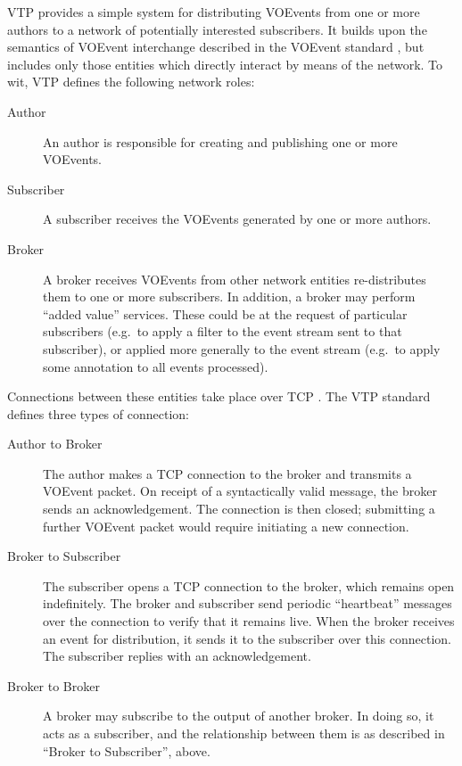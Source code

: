 \documentclass[5p,authoryear]{elsarticle}
\begin{document}
VTP provides a simple system for distributing VOEvents from one or more
authors to a network of potentially interested subscribers. It builds upon the
semantics of VOEvent interchange described in the VOEvent standard
\citep{Seaman:2011}, but includes only those entities which directly interact
by means of the network. To wit, VTP defines the following network roles:

\begin{description}

  \item[Author]{An author is responsible for creating and publishing one or
  more VOEvents.}

  \item[Subscriber]{A subscriber receives the VOEvents generated by one or
  more authors.}

  \item[Broker]{A broker receives VOEvents from other network entities
  re-distributes them to one or more subscribers. In addition, a broker may
  perform ``added value'' services. These could be at the request of
  particular subscribers (e.g.\ to apply a filter to the event stream sent
  to that subscriber), or applied more generally to the event stream (e.g.\ to
  apply some annotation to all events processed).}

\end{description}

Connections between these entities take place over TCP \citep{Cerf:1974}. The
VTP standard defines three types of connection:

\begin{description}

  \item[Author to Broker]{The author makes a TCP connection to the broker and
  transmits a VOEvent packet. On receipt of a syntactically valid message, the
  broker sends an acknowledgement.  The connection is then closed; submitting
  a further VOEvent packet would require initiating a new connection.}

  \item[Broker to Subscriber]{The subscriber opens a TCP connection to the
  broker, which remains open indefinitely. The broker and subscriber send
  periodic ``heartbeat'' messages over the connection to verify that it
  remains live.  When the broker receives an event for distribution, it sends
  it to the subscriber over this connection. The subscriber replies with an
  acknowledgement.}

  \item[Broker to Broker]{A broker may subscribe to the output of another
  broker. In doing so, it acts as a subscriber, and the relationship between
  them is as described in ``Broker to Subscriber'', above.}

\end{description}
\end{document}
